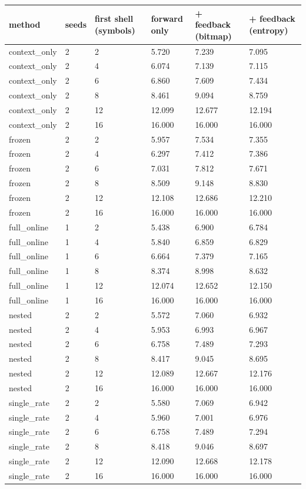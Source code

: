 \begin{tabular}{llllll}
\hline
method & seeds & first shell (symbols) & forward only & + feedback (bitmap) & + feedback (entropy) \\
\hline
context\_only & 2 & 2 & 5.720 & 7.239 & 7.095 \\
context\_only & 2 & 4 & 6.074 & 7.139 & 7.115 \\
context\_only & 2 & 6 & 6.860 & 7.609 & 7.434 \\
context\_only & 2 & 8 & 8.461 & 9.094 & 8.759 \\
context\_only & 2 & 12 & 12.099 & 12.677 & 12.194 \\
context\_only & 2 & 16 & 16.000 & 16.000 & 16.000 \\
frozen & 2 & 2 & 5.957 & 7.534 & 7.355 \\
frozen & 2 & 4 & 6.297 & 7.412 & 7.386 \\
frozen & 2 & 6 & 7.031 & 7.812 & 7.671 \\
frozen & 2 & 8 & 8.509 & 9.148 & 8.830 \\
frozen & 2 & 12 & 12.108 & 12.686 & 12.210 \\
frozen & 2 & 16 & 16.000 & 16.000 & 16.000 \\
full\_online & 1 & 2 & 5.438 & 6.900 & 6.784 \\
full\_online & 1 & 4 & 5.840 & 6.859 & 6.829 \\
full\_online & 1 & 6 & 6.664 & 7.379 & 7.165 \\
full\_online & 1 & 8 & 8.374 & 8.998 & 8.632 \\
full\_online & 1 & 12 & 12.074 & 12.652 & 12.150 \\
full\_online & 1 & 16 & 16.000 & 16.000 & 16.000 \\
nested & 2 & 2 & 5.572 & 7.060 & 6.932 \\
nested & 2 & 4 & 5.953 & 6.993 & 6.967 \\
nested & 2 & 6 & 6.758 & 7.489 & 7.293 \\
nested & 2 & 8 & 8.417 & 9.045 & 8.695 \\
nested & 2 & 12 & 12.089 & 12.667 & 12.176 \\
nested & 2 & 16 & 16.000 & 16.000 & 16.000 \\
single\_rate & 2 & 2 & 5.580 & 7.069 & 6.942 \\
single\_rate & 2 & 4 & 5.960 & 7.001 & 6.976 \\
single\_rate & 2 & 6 & 6.758 & 7.489 & 7.294 \\
single\_rate & 2 & 8 & 8.418 & 9.046 & 8.697 \\
single\_rate & 2 & 12 & 12.090 & 12.668 & 12.178 \\
single\_rate & 2 & 16 & 16.000 & 16.000 & 16.000 \\
\hline
\end{tabular}
